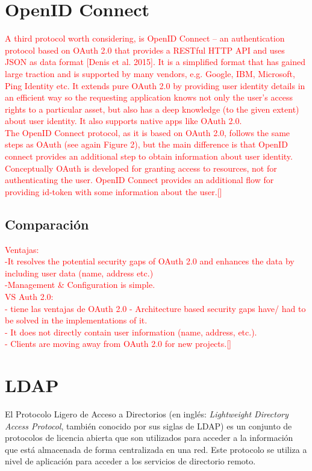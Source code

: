 \section{OpenID Connect}
\textcolor{red}{A third protocol worth considering, is OpenID Connect – an authentication
	protocol based on OAuth 2.0 that provides a RESTful HTTP API and uses JSON as
	data format [Denis et al. 2015]. It is a simplified format that has gained large traction
	and is supported by many vendors, e.g. Google, IBM, Microsoft, Ping Identity etc.
	It extends pure OAuth 2.0 by providing user identity details in an efficient way so
	the requesting application knows not only the user’s access rights to a particular
	asset, but also has a deep knowledge (to the given extent) about user identity. It also
	supports native apps like OAuth 2.0. \\
	The OpenID Connect protocol, as it is based on OAuth 2.0, follows the same
	steps as OAuth (see again Figure 2), but the main difference is that OpenID connect
	provides an additional step to obtain information about user identity. Conceptually
	OAuth is developed for granting access to resources, not for authenticating the
	user. OpenID Connect provides an additional flow for providing id-token with
	some information about the user.[\cite{kutera2016single}]}

\subsection{Comparación}
\textcolor{red}{
	Ventajas:\\
	-It resolves the potential security gaps of OAuth 2.0 and enhances the data by including user data (name, address etc.) \\
	-Management \& Configuration is simple.	\\
	VS Auth 2.0: \\
	- tiene las ventajas de OAuth 2.0
	- Architecture based security gaps have/ had to be solved in the implementations of it.\\
	- It does not directly contain user information (name, address, etc.).\\
	- Clients are moving away from OAuth 2.0 for new projects.[\cite{kutera2016single}]}

\section{LDAP}
El Protocolo Ligero de Acceso a Directorios (en inglés: \emph{Lightweight Directory Access Protocol}, también conocido por sus siglas de LDAP) es un conjunto de protocolos de licencia abierta que son utilizados para acceder a la información que está almacenada de forma centralizada en una red. Este protocolo se utiliza a nivel de aplicación para acceder a los servicios de directorio remoto.

